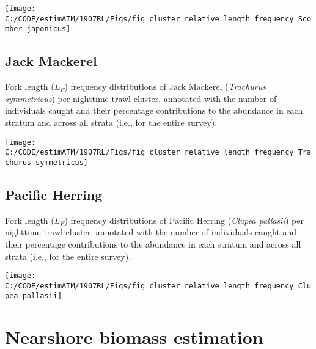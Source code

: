 \documentclass[]{article}
\begin{document}
\begin{center}\texttt{[image: C:/CODE/estimATM/1907RL/Figs/fig\_cluster\_relative\_length\_frequency\_Scomber japonicus]} \end{center}

\newpage

\hypertarget{appendix-cluster-length-percent-jack}{%
\subsection{Jack Mackerel}\label{appendix-cluster-length-percent-jack}}

Fork length (\(L_F\)) frequency distributions of Jack Mackerel (\emph{Trachurus symmetricus}) per nighttime trawl cluster, annotated with the number of individuals caught and their percentage contributions to the abundance in each stratum and across all strata (i.e., for the entire survey).



\begin{center}\texttt{[image: C:/CODE/estimATM/1907RL/Figs/fig\_cluster\_relative\_length\_frequency\_Trachurus symmetricus]} \end{center}

\newpage

\hypertarget{appendix-cluster-length-percent-herring}{%
\subsection{Pacific Herring}\label{appendix-cluster-length-percent-herring}}

Fork length (\(L_F\)) frequency distributions of Pacific Herring (\emph{Clupea pallasii}) per nighttime trawl cluster, annotated with the number of individuals caught and their percentage contributions to the abundance in each stratum and across all strata (i.e., for the entire survey).



\begin{center}\texttt{[image: C:/CODE/estimATM/1907RL/Figs/fig\_cluster\_relative\_length\_frequency\_Clupea pallasii]} \end{center}

\newpage

\hypertarget{appendix-nearshore-biomass}{%
\section{Nearshore biomass estimation}\label{appendix-nearshore-biomass}}
\end{document}
